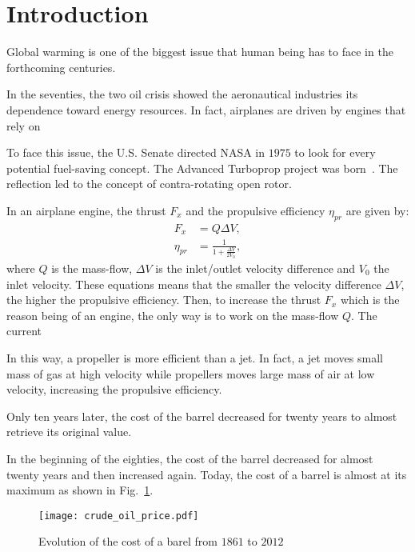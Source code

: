 
\chapter*{Introduction}

Global warming is one of the biggest issue that human being
has to face in the forthcoming centuries. 










In the seventies, the two oil crisis showed the aeronautical 
industries its dependence toward energy resources. In fact,
airplanes are driven by engines that rely on  


To face this issue, the U.S. Senate directed NASA in $1975$
to look for every potential fuel-saving concept. The Advanced Turboprop
project was born~\cite{Hager1988}. The reflection led to the
concept of contra-rotating open rotor.

In an airplane engine, 
the thrust $F_x$ and the propulsive efficiency $\eta_{pr}$ are given by:
\begin{equation}
	\begin{split}
		F_x &= Q \Delta V, \\
		\eta_{pr} &= \displaystyle \frac{1}{1 + \displaystyle \frac{\Delta V}{2 V_0}},
	\end{split}
\end{equation}
where $Q$ is the mass-flow, $\Delta V$ is the inlet/outlet velocity difference and $V_0$
the inlet velocity. These equations means that the 
smaller the velocity difference $\Delta V$, the higher the propulsive efficiency.
Then, to increase the thrust $F_x$ which is the reason being of an engine,
the only way is to work on the mass-flow $Q$.
The current

In this way, a propeller is more efficient than a jet. In fact, a jet 
moves small mass of gas at high velocity while propellers moves 
large mass of air at low velocity, increasing the propulsive efficiency.

Only ten years later, the cost of 
the barrel decreased for twenty years to almost retrieve its original
value. 

In the beginning of the eighties, the cost of 
the barrel decreased for almost twenty years and then increased again.
Today, the cost of a barrel is almost at its maximum as shown
in Fig.~\ref{fig:crude_oil_price}.
\begin{figure}[htbp]
  \centering
  \texttt{[image: crude\_oil\_price.pdf]}
  \caption{Evolution of the cost of a barel from $1861$ to $2012$ \cite{bpreview2013}}
  \label{fig:crude_oil_price}
\end{figure}

